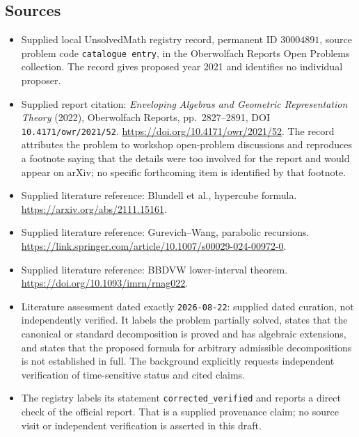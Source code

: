 \documentclass[11pt]{article}
\begin{document}
\subsection{Sources}
\begin{itemize}
\item Supplied local UnsolvedMath registry record, permanent ID \(30004891\), source problem code \texttt{catalogue entry}, in the Oberwolfach Reports Open Problems collection. The record gives proposed year 2021 and identifies no individual proposer.
\item Supplied report citation: \emph{Enveloping Algebras and Geometric Representation Theory} (2022), Oberwolfach Reports, pp.\ 2827--2891, DOI \texttt{10.4171/owr/2021/52}. \url{https://doi.org/10.4171/owr/2021/52}. The record attributes the problem to workshop open-problem discussions and reproduces a footnote saying that the details were too involved for the report and would appear on arXiv; no specific forthcoming item is identified by that footnote.
\item Supplied literature reference: Blundell et al., hypercube formula. \url{https://arxiv.org/abs/2111.15161}.
\item Supplied literature reference: Gurevich--Wang, parabolic recursions. \url{https://link.springer.com/article/10.1007/s00029-024-00972-0}.
\item Supplied literature reference: BBDVW lower-interval theorem. \url{https://doi.org/10.1093/imrn/rnag022}.
\item Literature assessment dated exactly \texttt{2026-08-22}: supplied dated curation, not independently verified. It labels the problem partially solved, states that the canonical or standard decomposition is proved and has algebraic extensions, and states that the proposed formula for arbitrary admissible decompositions is not established in full. The background explicitly requests independent verification of time-sensitive status and cited claims.
\item The registry labels its statement \texttt{corrected\_verified} and reports a direct check of the official report. That is a supplied provenance claim; no source visit or independent verification is asserted in this draft.
\end{itemize}
\end{document}
